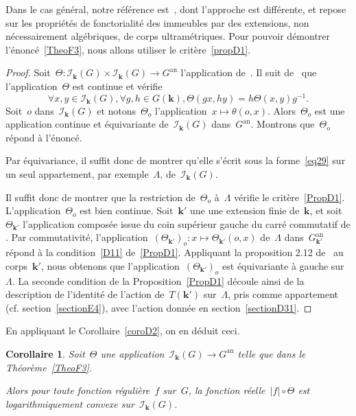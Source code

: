 \documentclass[french]{amsart}
\newcommand{\kk}{\mathbf{k}}
\newcommand{\abs}[1]{{\left|{#1}\right|}}
\newcommand{\Ik}{\mathscr{I}_\kk}
\newcommand{\an}{\textrm{an}}
\newtheorem{corollaire}{Corollaire}[section]
\begin{document}
Dans le cas général, notre référence est~\cite{RTW09}, dont l'approche est différente, et repose sur les propriétés de fonctorialité des immeubles par des
extensions, non nécessairement algébriques, de corps ultramétriques. Pour pouvoir démontrer l'énon\-cé~\ref{TheoF3}, nous allons utiliser le critère~\ref{propD1}.
\begin{proof}
Soit~$\Theta:\Ik(G)\times\Ik(G)\to G^\an$ l'application de~\cite[2.3]{RTW09}.
Il suit de~\cite[Proposition~2.12]{RTW09} que l'application~$\Theta$ est continue et vérifie
\[
	\forall x,y\in \Ik(G),
		\forall g,h \in G(\kk),
				\Theta(gx,hy)=h\Theta(x,y)g^{-1}.
\]
Soit~$o$ dans~$\Ik(G)$ et notons~$\Theta_o$ l'application~$x\mapsto\theta(o,x)$. Alors~$\Theta_o$  est une application continue et équivariante de~$\Ik(G)$ dans~$G^\an$. Montrons que~$\Theta_o$ répond à
l'énoncé.

Par équivariance, il suffit donc de montrer qu'elle s'écrit sous la forme~\eqref{eq29} sur un seul appartement, par exemple~$\Lambda$, de~$\Ik (G)$.

Il suffit donc de montrer que la restriction de~$\Theta_o$ à~$\Lambda$ vérifie le critère~\ref{PropD1}. L'application~$\Theta_o$ est bien continue.
Soit~$\kk'$ une  une extension finie de~$\kk$, et soit~$\Theta_{\kk'}$ l'application composée issue du coin supérieur gauche du carré commutatif de \cite[Proposition 2.12 (ii).]{RTW09}.
Par commutativité, l'application~$(\Theta_{\kk'})_o:x\mapsto \Theta_{\kk'}(o,x)$ de~$\Lambda$ dans~$G_{\kk'}^\an$ répond  à la condition~\ref{D11} de~\ref{PropD1}.
Appliquant la proposition 2.12 de~\cite{RTW09} au corps~$\kk'$, nous obtenons que l'application~$(\Theta_{\kk'})_o$ est équivariante à gauche sur~$\Lambda$.
La seconde condition de la Proposition~\ref{PropD1} découle ainsi de la description de l'identité de l'action de~$T(\kk')$ sur~$\Lambda$, pris comme appartement (cf. section~\ref{sectionE4}), avec l'action donnée en section~\ref{sectionD31}.

\end{proof}
En appliquant le Corollaire~\ref{coroD2}, on en déduit ceci.
\begin{corollaire}\label{coroF4}
Soit~$\Theta$ une application~$\Ik(G) \rightarrow G^\an$ telle que dans le
Théorème~\ref{TheoF3}. 

Alors pour toute fonction régulière~$f$ sur~$G$, la fonction réelle~$\abs{f}  \circ\Theta$ est logarithmiquement convexe sur~$\Ik(G)$.
\end{corollaire}
  

\end{document}
